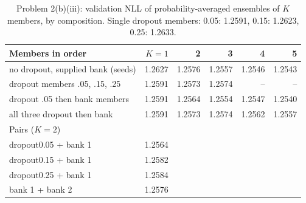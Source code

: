 \begin{table}[H]\centering\small\caption{Problem 2(b)(iii): validation NLL of probability-averaged ensembles of $K$ members, by composition. Single dropout members: 0.05: 1.2591, 0.15: 1.2623, 0.25: 1.2633.}\label{tab:comp}
\begin{tabular}{lrrrrr}\toprule Members in order & $K=1$ & 2 & 3 & 4 & 5 \\ \midrule
no dropout, supplied bank (seeds) & 1.2627 & 1.2576 & 1.2557 & 1.2546 & 1.2543 \\
dropout members .05, .15, .25 & 1.2591 & 1.2573 & 1.2574 & -- & -- \\
dropout .05 then bank members & 1.2591 & 1.2564 & 1.2554 & 1.2547 & 1.2540 \\
all three dropout then bank & 1.2591 & 1.2573 & 1.2574 & 1.2562 & 1.2557 \\
\midrule \multicolumn{6}{l}{Pairs ($K=2$)} \\
dropout0.05 + bank 1 & 1.2564 \\
dropout0.15 + bank 1 & 1.2582 \\
dropout0.25 + bank 1 & 1.2584 \\
bank 1 + bank 2 & 1.2576 \\
\bottomrule\end{tabular}\end{table}
